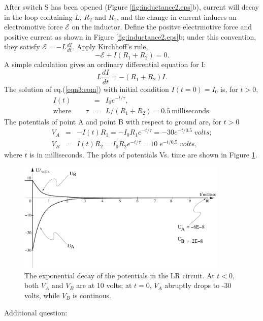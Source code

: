 \documentclass[solutions]{esg8022pset}
\begin{document}
After switch S has been opened (Figure \ref{fig:inductance2.eps}b),
current will decay in the loop containing $L$, $R_2$ and $R_1$, and
the change in current induces an electromotive force $\mathcal{E}$ on
the inductor.  Define the positve electrmotive force and positive
current as shown in Figure \ref{fig:inductance2.eps}b; under this
convention, they satisfy ${\mathcal{E}}=-L\frac{dI}{dt}$.  Apply
Kirchhoff's rule,
\begin{equation}
-{\mathcal{E}}+I(R_1+R_2)=0.
\end{equation}
A simple calculation gives an ordinary differential equation for I:
\begin{equation}\label{eqn3:eom}
L\frac{dI}{dt}=-(R_1+R_2)I.
\end{equation}
The solution of eq.(\ref{eqn3:eom}) with initial condition
$I(t=0)=I_0$ is, for $t>0$,
\begin{eqnarray}
I(t) &=& I_0 e^{-t/\tau},\\
\textrm{where}\qquad \tau &=& L/(R_1+R_2)=0.5\: \textrm{milliseconds}.
\end{eqnarray}
The potentials of point A and point B with respect to ground are, for $t>0$
\begin{eqnarray}
V_A &=& -I(t)R_1=-I_0 R_1 e^{-t/\tau}= -30e^{-t/0.5}\;volts;\\
V_B &=& I(t)R_2=I_0 R_2 e^{-t/\tau}= 10\;e^{-t/0.5}\;volts,
\end{eqnarray}
where $t$ is in milliseconds.  The plots of potentials Vs. time are
shown in Figure \ref{fig:graph22.eps}.


\begin{figure}[H]
    \centering
    \includegraphics[width = 10cm]{graph22}
    \caption{The exponential decay of the potentials in the LR circuit.
At $t<0$, both $V_A$ and $V_B$ are at 10 volts; at $t=0$, $V_A$
abruptly drops to -30 volts, while $V_B$ is continous.}
    \label{fig:graph22.eps}
  \end{figure}


Additional question:
\end{document}
